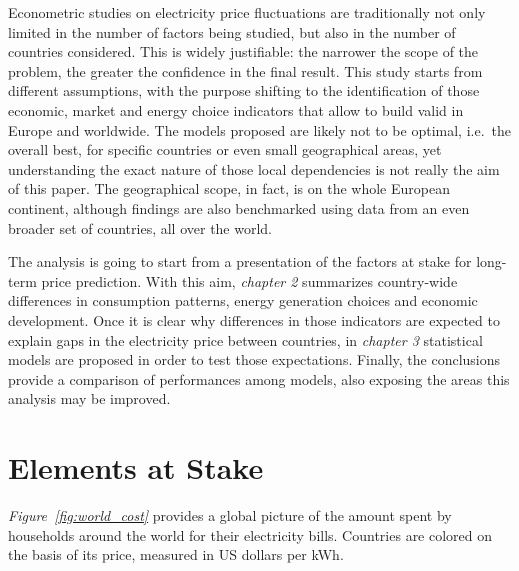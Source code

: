 \documentclass[a4paper,12pt]{book}
\begin{document}
Econometric studies on electricity price fluctuations are traditionally not only limited in the number of factors being studied, but also in the number of countries considered. This is widely justifiable: the narrower the scope of the problem, the greater the confidence in the final result. This study starts from different assumptions, with the purpose shifting to the identification of those economic, market and energy choice indicators that allow to build valid in Europe and worldwide. The models proposed are likely not to be optimal, i.e.~the overall best, for specific countries or even small geographical areas, yet understanding the exact nature of those local dependencies is not really the aim of this paper. The geographical scope, in fact, is on the whole European continent, although findings are also benchmarked using data from an even broader set of countries, all over the world.

The analysis is going to start from a presentation of the factors at stake for long-term price prediction. With this aim, \textit{chapter 2} summarizes country-wide differences in consumption patterns, energy generation choices and economic development. Once it is clear why differences in those indicators are expected to explain gaps in the electricity price between countries, in \textit{chapter 3} statistical models are proposed in order to test those expectations. Finally, the conclusions provide a comparison of performances among models, also exposing the areas this analysis may be improved.

\chapter{Elements at Stake}

\textit{Figure~\ref{fig:world_cost}} provides a global picture of the amount spent by households around the world for their electricity bills. Countries are colored on the basis of its price, measured in US dollars per kWh.
\end{document}
